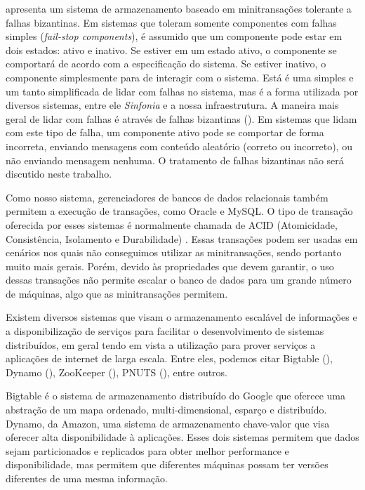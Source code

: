 \documentclass[11pt,twoside,a4paper]{book}
\begin{document}
\cite{padilha} apresenta um sistema de armazenamento baseado em minitransações tolerante a falhas bizantinas. Em sistemas que toleram somente componentes com falhas simples (\emph{fail-stop components}), é assumido que um componente pode estar em dois estados: ativo e inativo. Se estiver em um estado ativo, o componente se comportará de acordo com a especificação do sistema. Se estiver inativo, o componente simplesmente para de interagir com o sistema. Está é uma simples e um tanto simplificada de lidar com falhas no sistema, mas é a forma utilizada por diversos sistemas, entre ele \emph{Sinfonia} e a nossa infraestrutura. A maneira mais geral de lidar com falhas é através de falhas bizantinas (\cite{byzantine}). Em sistemas que lidam com este tipo de falha, um componente ativo pode se comportar de forma incorreta, enviando mensagens com conteúdo aleatório (correto ou incorreto), ou não enviando mensagem nenhuma. O tratamento de falhas bizantinas não será discutido neste trabalho.

Como nosso sistema, gerenciadores de bancos de dados relacionais também permitem a execução de transações, como Oracle e MySQL. O tipo de transação oferecida por esses sistemas é normalmente chamada de ACID (Atomicidade, Consistência, Isolamento e Durabilidade) \cite{vaca}. Essas transações podem ser usadas em cenários nos quais não conseguimos utilizar as minitransações, sendo portanto muito mais gerais. Porém, devido às propriedades que devem garantir, o uso dessas transações não permite escalar o banco de dados para um grande número de máquinas, algo que as minitransações permitem.

Existem diversos sistemas que visam o armazenamento escalável de informações e a disponibilização de serviços para facilitar o desenvolvimento de sistemas distribuídos, em geral tendo em vista a utilização para prover serviços a aplicações de internet de larga escala. Entre eles, podemos citar Bigtable (\cite{bigtable}), Dynamo (\cite{dynamo}), ZooKeeper (\cite{zookeeper}), PNUTS (\cite{pnuts}), entre outros. 

Bigtable é o sistema de armazenamento distribuído do Google que oferece uma abstração de um mapa ordenado, multi-dimensional, esparço e distribuído. Dynamo, da Amazon, uma sistema de armazenamento chave-valor que visa oferecer alta disponibilidade à aplicações. Esses dois sistemas permitem que dados sejam particionados e replicados para obter melhor performance e disponibilidade, mas permitem que diferentes máquinas possam ter versões diferentes de uma mesma informação. 
\end{document}
